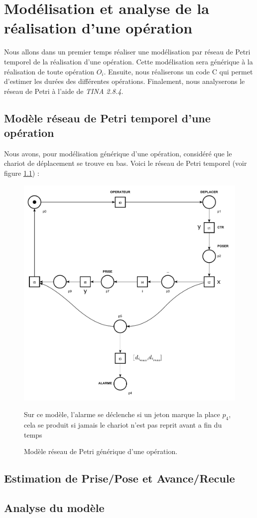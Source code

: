\chapter{Modélisation et analyse de la réalisation d'une opération}
Nous allons dans un premier temps réaliser une modélisation par réseau de Petri temporel de la réalisation d'une opération. Cette modélisation sera générique à la réalisation de toute opération $O_i$. Ensuite, nous réaliserons un code C qui permet d'estimer les durées des différentes opérations. Finalement, nous analyserons le réseau de Petri à l'aide de \emph{TINA 2.8.4}.

\section{Modèle réseau de Petri temporel d'une opération}
Nous avons, pour modélisation générique d'une opération, considéré que le chariot de déplacement se trouve en bas. Voici le réseau de Petri temporel (voir figure \ref{fig:RdPTempo_generique}) : 
\begin{figure}[!ht]
\centering
\includegraphics[width=.57\textwidth]{./I/images/III-1_V3.pdf}
\caption{\label{fig:RdPTempo_generique}Modèle réseau de Petri générique d'une opération.}
Sur ce modèle, l'alarme se déclenche si un jeton marque la place $p_4$, cela se produit si jamais le chariot n'est pas reprit avant a fin du temps 
\end{figure}
\section{Estimation de Prise/Pose et Avance/Recule}
\section{Analyse du modèle}